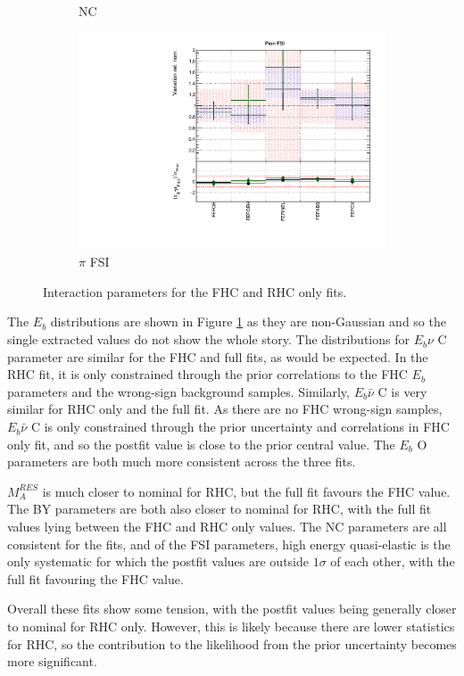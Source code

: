 \begin{figure}
\begin{subfigure}{0.49\textwidth}
  \caption{NC}
\end{subfigure}
\begin{subfigure}{0.49\textwidth}
  \centering
  \includegraphics[width=0.9\linewidth]{figs/fhcrhcfitsxsec_5}
  \caption{$\pi$ FSI}
\end{subfigure}
\caption{Interaction parameters for the FHC and RHC only fits.}
\label{fig:fhcrhcxsec}
\end{figure}

The $E_b$ distributions are shown in Figure \ref{fig:fhcrhcxsec} as they are non-Gaussian and so the single extracted values do not show the whole story. The distributions for $E_b \nu$ C parameter are similar for the FHC and full fits, as would be expected. In the RHC fit, it is only constrained through the prior correlations to the FHC $E_b$ parameters and the wrong-sign background samples. Similarly, $E_b \bar{\nu}$ C is very similar for RHC only and the full fit. As there are no FHC wrong-sign samples, $E_b \bar{\nu}$ C is only constrained through the prior uncertainty and correlations in FHC only fit, and so the postfit value is close to the prior central value. The $E_b$ O parameters are both much more consistent across the three fits.

$M_{A}^{RES}$ is much closer to nominal for RHC, but the full fit favours the FHC value. The BY parameters are both also closer to nominal for RHC, with the full fit values lying between the FHC and RHC only values. The NC parameters are all consistent for the fits, and of the FSI parameters, high energy quasi-elastic is the only systematic for which the postfit values are outside $1\sigma$ of each other, with the full fit favouring the FHC value.

Overall these fits show some tension, with the postfit values being generally closer to nominal for RHC only. However, this is likely because there are lower statistics for RHC, so the contribution to the likelihood from the prior uncertainty becomes more significant.

